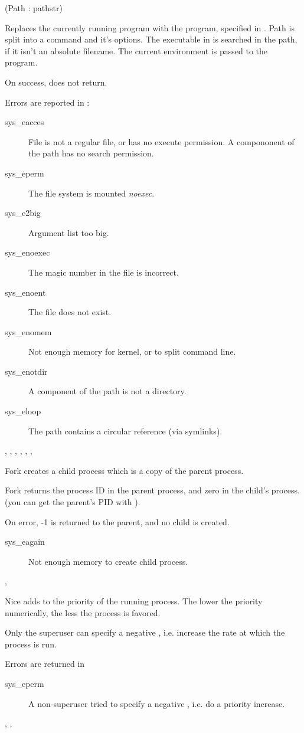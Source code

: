 

{(Path : pathstr)}
{
Replaces the currently running program with the program, specified in
. Path is split into a command and it's options.
The executable in  is searched in the path, if it isn't
an absolute filename.
The current environment is passed to the program.

On success,  does not return.
}
{Errors are reported in :
\begin{description}
\item[sys\_eacces] File is not a regular file, or has no execute permission.
A compononent of the path has no search permission.
\item[sys\_eperm] The file system is mounted \textit{noexec}.
\item[sys\_e2big] Argument list too big.
\item[sys\_enoexec] The magic number in the file is incorrect.
\item[sys\_enoent] The file does not exist.
\item[sys\_enomem] Not enough memory for kernel, or to split command line.
\item[sys\_enotdir] A component of the path is not a directory.
\item[sys\_eloop] The path contains a circular reference (via symlinks).
\end{description}}
{, , , ,
, ,  }



{
Fork creates a child process which is a copy of the parent process.

Fork returns the process ID in the parent process, and zero in the child's
process. (you can get the parent's PID with ).
}
{On error, -1 is returned to the parent, and no child is created.
\begin{description}
\item [sys\_eagain] Not enough memory to create child process.
\end{description}
}
{, }



{Nice adds  to the priority of the running process. The lower the
priority numerically, the less the process is favored.

Only the superuser can specify a negative , i.e. increase the rate at
which the process is run.
}
{ Errors are returned in 
\begin{description}
\item [sys\_eperm] A non-superuser tried to specify a negative , i.e.
do a priority increase.
\end{description}
}{, , }

